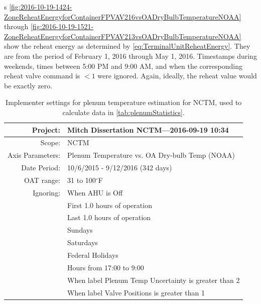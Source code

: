 \figref{}s
\ref{fig:2016-10-19-1424-ZoneReheatEnergyforContainerFPVAV216vsOADryBulbTemperatureNOAA}
through
\ref{fig:2016-10-19-1521-ZoneReheatEnergyforContainerFPVAV213vsOADryBulbTemperatureNOAA}
show the reheat energy as determined by 
\ref{eq:TerminalUnitReheatEnergy}. They are from the period of February
1, 2016 through May 1, 2016.  Timestamps during weekends, times between
5:00 PM and 9:00 AM, and when the corresponding reheat valve command is
\( < 1 \) were ignored. Again, ideally, the reheat value would be
exactly zero.


\begin{table}[]
\centering
\caption{Implementer settings for plenum temperature estimation for NCTM, used to calculate data in \tableref{} \ref{tab:plenumStatistics}.}
\label{tab:PlenumTemperatureEstimation}
\begin{tabular}{@{}rl@{}}
\toprule
Project:            & Mitch Dissertation NCTM---2016-09-19 10:34           \\ \midrule
Scope:              & NCTM                                                 \\
Axis Parameters:    & Plenum Temperature vs. OA Dry-bulb Temp (NOAA)       \\
Date Period:        & 10/6/2015 - 9/12/2016  (342 days)                    \\
OAT range:          & 31 to 100\(^\circ\)F                                 \\
Ignoring:           & When AHU is Off                                      \\
                    & First 1.0 hours of operation                         \\
                    & Last 1.0 hours of operation                          \\
                    & Sundays                                              \\
                    & Saturdays                                            \\
                    & Federal Holidays                                     \\
                    & Hours from 17:00 to 9:00                             \\
                    & When label Plenum Temp Uncertainty is greater than 2 \\
                    & When label Valve Positions is greater than 1         \\ \bottomrule
\end{tabular}
\end{table}



